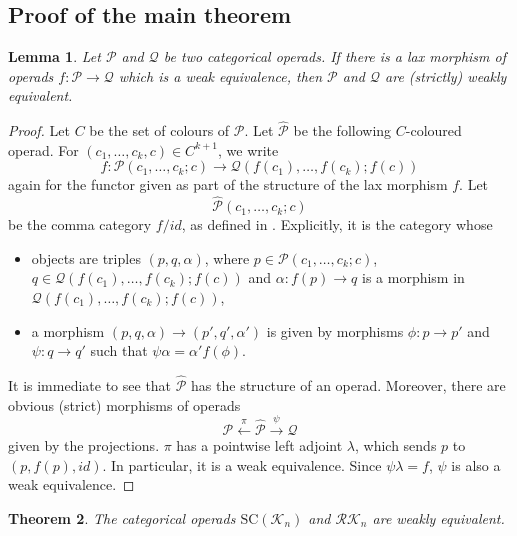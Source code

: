 \documentclass[]{amsart}
\newtheorem{theorem}{Theorem}[section]
\newtheorem{lemma}[theorem]{Lemma}
\theoremstyle{definition}
\begin{document}
\subsection{Proof of the main theorem}

\begin{lemma}\label{lemmazigzagwe}
	Let $\mathcal{P}$ and $\mathcal{Q}$ be two categorical operads. If there is a lax morphism of operads $f: \mathcal{P} \to \mathcal{Q}$ which is a weak equivalence, then $\mathcal{P}$ and $\mathcal{Q}$ are (strictly) weakly equivalent.
\end{lemma}

\begin{proof}
	Let $C$ be the set of colours of $\mathcal{P}$. Let $\hat{\mathcal{P}}$ be the following $C$-coloured operad. For $(c_1,\ldots,c_k,c) \in C^{k+1}$, we write
	\[
		f: \mathcal{P}(c_1,\ldots,c_k;c) \to \mathcal{Q}(f(c_1),\ldots,f(c_k);f(c))
	\]
	again for the functor given as part of the structure of the lax morphism $f$. Let
	\[
		\hat{\mathcal{P}}(c_1,\ldots,c_k;c)
	\]
	be the comma category $f/id$, as defined in \cite[Section II.6]{maclane}. Explicitly, it is the category whose
	\begin{itemize}
		\item objects are triples $(p,q,\alpha)$, where $p \in \mathcal{P}(c_1,\ldots,c_k;c)$, $q \in \mathcal{Q}(f(c_1),\ldots,f(c_k);f(c))$ and $\alpha: f(p) \to q$ is a morphism in $\mathcal{Q}(f(c_1),\ldots,f(c_k);f(c))$,
		
		\item a morphism $(p,q,\alpha) \to (p',q',\alpha')$ is given by morphisms $\phi: p \to p'$ and $\psi: q \to q'$ such that $\psi \alpha = \alpha' f(\phi)$.
	\end{itemize}
	It is immediate to see that $\hat{\mathcal{P}}$ has the structure of an operad. Moreover, there are obvious (strict) morphisms of operads
	\[
		\mathcal{P} \xleftarrow{\pi} \hat{\mathcal{P}} \xrightarrow{\psi} \mathcal{Q}
	\]
	given by the projections. $\pi$ has a pointwise left adjoint $\lambda$, which sends $p$ to $(p,f(p),id)$. In particular, it is a weak equivalence. Since $\psi \lambda = f$, $\psi$ is also a weak equivalence.
\end{proof}



\begin{theorem}\label{theoremswisscheese}
	The categorical operads $\mathrm{SC}(\mathcal{K}_n)$ and $\mathcal{RK}_n$ are weakly equivalent.
\end{theorem}
\end{document}
